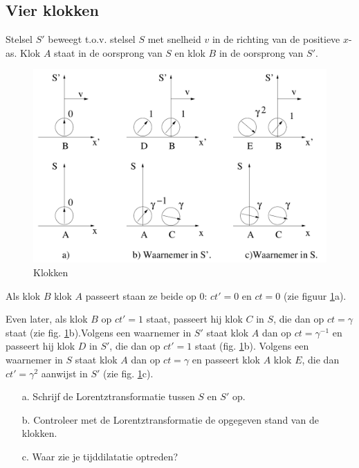 \subsection{Vier klokken}
Stelsel $S'$ beweegt t.o.v. stelsel $S$ met snelheid $v$ in de richting
van de positieve $x$-as.
Klok $A$ staat in de oorsprong van $S$ en klok $B$ in de oorsprong van $S'$.


\begin{figure}[ht]
\centering
\includegraphics[width=.8\textwidth]{oefeningen.pictures/klokken}
\caption{Klokken}
\label{f:klokken}
\end{figure}

Als klok $B$ klok $A$ passeert staan ze beide op 0: $ct'=0$ en $ct=0$
(zie figuur \ref{f:klokken}a).


Even later, als klok $B$ op $ct'=1$ staat, passeert hij klok $C$ in $S$,
die dan op $ct=\gamma$ staat (zie fig. \ref{f:klokken}b).Volgens een waarnemer in $S'$ staat klok $A$ dan op $ct = \gamma^{-1}$ en 
passeert hij klok $D$ in $S'$, die dan op $ct'=1$ staat 
(fig. \ref{f:klokken}b). Volgens een waarnemer in $S$ staat klok $A$ dan op $ct=\gamma$ en 
passeert klok $A$ klok $E$, die dan $ct'=\gamma^{2}$ aanwijst in $S'$  (zie fig. \ref{f:klokken}c).

\begin{itemize}
\item [a.]
Schrijf de Lorentztransformatie tussen $S$ en $S'$ op.
\item [b.]
Controleer met de Lorentztransformatie de opgegeven stand van de klokken.
\item [c.]
Waar zie je tijddilatatie optreden?

\end{itemize}


